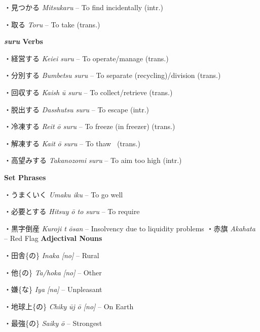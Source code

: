 \par{・見つかる \emph{Mitsukaru }– To find incidentally (intr.) }

\par{・取る \emph{Toru }– To take (trans.) }

\par{\textbf{\emph{suru }Verbs }}

\par{・経営する \emph{Keiei suru }– To operate\slash manage (trans.) }

\par{・分別する \emph{Bumbetsu suru }– To separate (recycling)\slash division (trans.) }

\par{・回収する \emph{Kaish }\emph{ū suru }– To collect\slash retrieve (trans.) }

\par{・脱出する \emph{Dasshutsu suru }– To escape (intr.) }

\par{・冷凍する \emph{Reit }\emph{ō suru }– To freeze (in freezer) (trans.) }

\par{・解凍する \emph{Kait }\emph{ō suru }– To thaw  (trans.) }

\par{・高望みする \emph{Takanozomi suru }– To aim too high (intr.) }

\par{\textbf{Set Phrases }}

\par{・うまくいく \emph{Umaku iku }– To go well }

\par{・必要とする \emph{Hitsuy }\emph{ō to suru }– To require }

\par{・黒字倒産 \emph{Kuroji t }\emph{ōsan }– Insolvency due to liquidity problems }
・赤旗 \emph{Akahata }– Red Flag  \textbf{Adjectival Nouns }
\par{・田舎\{の\} \emph{Inaka [no] }– Rural }

\par{・他\{の\} \emph{Ta\slash hoka [no] }– Other }

\par{・嫌\{な\} \emph{Iya [na] }– Unpleasant }

\par{・地球上\{の\} \emph{Chiky }\emph{ūj }\emph{ō [no] }– On Earth }

\par{・最強\{の\} \emph{Saiky }\emph{ō }– Strongest }

